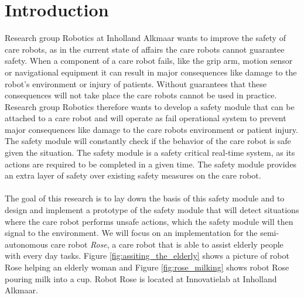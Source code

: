 \documentclass[12pt]{scrreprt}
\begin{document}
\chapter{Introduction}
\label{Introduction}
Research group Robotics at Inholland Alkmaar wants to improve the safety of care robots, as in the current state of affairs the care robots cannot guarantee safety. When a component of a care robot fails, like the grip arm, motion sensor or navigational equipment it can result in major consequences like damage to the robot's environment or injury of patients. Without guarantees that these consequences will not take place the care robots cannot be used in practice. Research group Robotics therefore wants to develop a safety module that can be attached to a care robot and will operate as fail operational system to prevent major consequences like damage to the care robots environment or patient injury. The safety module will constantly check if the behavior of the care robot is safe given the situation. The safety module is a safety critical real-time system, as its actions are required to be completed in a given time. The safety module provides an extra layer of safety over existing safety measures on the care robot.
\\\\
The goal of this research is to lay down the basis of this safety module and to design and implement a prototype of the safety module that will detect situations where the care robot performs unsafe actions, which the safety module will then signal to the environment. We will focus on an implementation for the semi-autonomous care robot \textit{Rose}, a care robot that is able to assist elderly people with every day tasks. Figure \ref{fig:assiting_the_elderly} shows a picture of robot Rose helping an elderly woman and Figure \ref{fig:rose_milking} shows robot Rose pouring milk into a cup. Robot Rose is located at Innovatielab at Inholland Alkmaar.
\\\\
\end{document}
